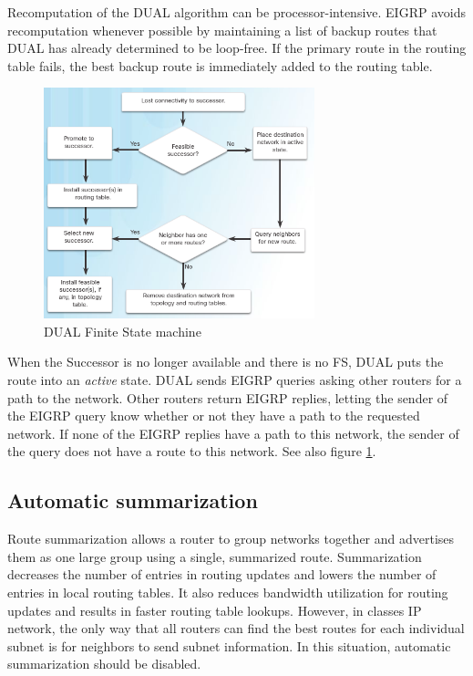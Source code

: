 Recomputation of the DUAL algorithm can be processor-intensive. EIGRP avoids recomputation whenever possible by maintaining a list of backup routes that DUAL has already determined to be loop-free. If the primary route in the routing table fails, the best backup route is immediately added to the routing table.\\

\begin{figure}[hbtp]
\centering
\includegraphics[width=0.7\textwidth]{pictures/EIGRP-DUAL.png}
\caption{DUAL Finite State machine} \label{EIGRP-DUAL}
\end{figure}

When the Successor is no longer available and there is no FS, DUAL puts the route into an \emph{active} state. DUAL sends EIGRP queries asking other routers for a path to the network. Other routers return EIGRP replies, letting the sender of the EIGRP query know whether or not they have a path to the requested network. If none of the EIGRP replies have a path to this network, the sender of the query does not have a route to this network. See also figure \ref{EIGRP-DUAL}.

\subsection{Automatic summarization}

Route summarization allows a router to group networks together and advertises them as one large group using a single, summarized route. Summarization decreases the number of entries in routing updates and lowers the number of entries in local routing tables. It also reduces bandwidth utilization for routing updates and results in faster routing table lookups. However, in classes IP network, the only way that all routers can find the best routes for each individual subnet is for neighbors to send subnet information. In this situation, automatic summarization should be disabled. \\

